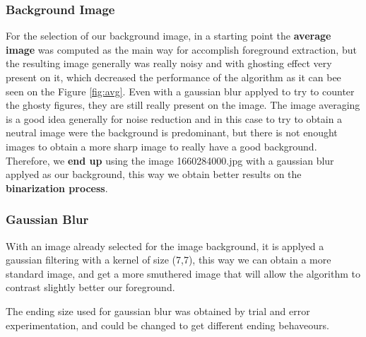 \documentclass[10pt]{article}
\begin{document}
\FloatBarrier
\subsubsection*{Background Image}

For the selection of our background image, in a starting point the \textbf{average image} was computed as the main way for accomplish foreground extraction, but the resulting image generally was really noisy and with ghosting effect very present on it, which decreased the performance of the algorithm as it can bee seen on the Figure \ref{fig:avg}. Even with a gaussian blur applyed to try to counter the ghosty figures, they are still really present on the image. The image averaging is a good idea generally for noise reduction and in this case to try to obtain a neutral image were the background is predominant, but there is not enought images to obtain a more sharp image to really have a good background. Therefore, we \textbf{end up} using the image 1660284000.jpg with a gaussian blur applyed as our background, this way we obtain better results on the \textbf{binarization process}.




\subsubsection*{Gaussian Blur}
With an image already selected for the image background, it is applyed a gaussian filtering with a kernel of size (7,7), this way  we can obtain a more standard image, and get a more smuthered image that will allow the algorithm to contrast slightly better our foreground.\newline




The ending size used for gaussian blur was obtained by trial and error experimentation, and could be changed to get different ending behaveours.
\end{document}

